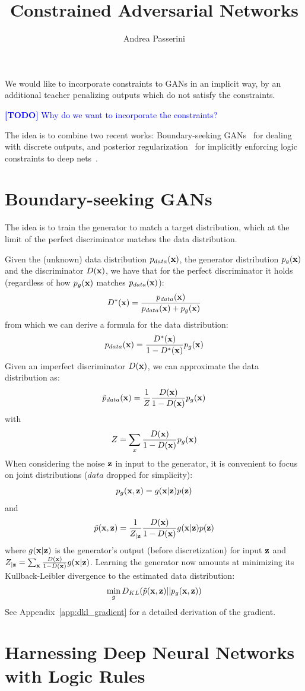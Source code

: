 \documentclass{article}
\newcommand{\todo}[1]{\textcolor{blue}{{\bf [TODO]} #1}}
\begin{document}
\title{Constrained Adversarial Networks}
\author{Andrea Passerini}

\maketitle

We would like to incorporate constraints to GANs in an implicit way,
by an additional teacher penalizing outputs which do not satisfy the
constraints.

\todo{Why do we want to incorporate the constraints? }

The idea is to combine two recent works: Boundary-seeking
GANs~\cite{bgan} for dealing with discrete outputs, and posterior
regularization~\cite{Ganchev2010} for implicitly enforcing logic constraints to
deep nets~\cite{logicdeep}.

\section{Boundary-seeking GANs}

The idea is to train the generator to match a target distribution,
which at the limit of the perfect discriminator matches the data
distribution.

Given the (unknown) data distribution $p_{data}({\mathbf x})$, the generator
distribution $p_g({\mathbf x})$ and the discriminator $D({\mathbf x})$, we have that for
the perfect discriminator it holds (regardless of how $p_g({\mathbf x})$
matches $p_{data}({\mathbf x})$):
$$
D^*({\mathbf x}) = \frac{p_{data}({\mathbf x})}{p_{data}({\mathbf x})+p_g({\mathbf x})}
$$
from which we can derive a formula for the data distribution:
$$
p_{data}({\mathbf x}) = \frac{D^*({\mathbf x})}{1-D^*({\mathbf x})}p_g({\mathbf x})
$$
Given an imperfect discriminator $D({\mathbf x})$, we can approximate the
data distribution as:
$$
\tilde{p}_{data}({\mathbf x}) = \frac{1}{Z} \frac{D({\mathbf x})}{1-D({\mathbf x})}p_g({\mathbf x})
$$
with
$$
Z = \sum_x \frac{D({\mathbf x})}{1-D({\mathbf x})}p_g({\mathbf x})
$$
When considering the noise ${\mathbf z}$ in input to the generator, it is
convenient to focus on joint distributions ($data$ dropped for
simplicity):
$$
p_g({\mathbf x},{\mathbf z})=g({\mathbf x}|{\mathbf z})p({\mathbf z})
$$
and
$$
\tilde{p}({\mathbf x},{\mathbf z}) = \frac{1}{Z_{|{\mathbf z}}} \frac{D({\mathbf x})}{1-D({\mathbf x})}g({\mathbf x}|{\mathbf z})p({\mathbf z})
$$
where $g({\mathbf x}|{\mathbf z})$ is the generator's output (before discretization) for
input ${\mathbf z}$ and $Z_{|{\mathbf z}}=\sum_{{\mathbf x}} \frac{D({\mathbf x})}{1-D({\mathbf x})}g({\mathbf x}|{\mathbf z})$. Learning
the generator now amounts at minimizing its Kullback-Leibler divergence
to the estimated data distribution:
$$
\min_g D_{KL}( \tilde{p}({\mathbf x},{\mathbf z}) || p_g({\mathbf x},{\mathbf z}))
$$
See Appendix~\ref{app:dkl_gradient} for a detailed derivation of the gradient.

\section{Harnessing Deep Neural Networks with Logic Rules}
\end{document}
